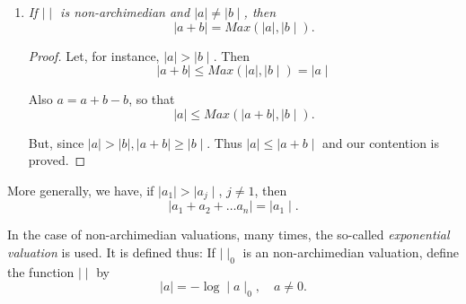 \begin{enumerate}[1)]
\begin{proof}
If $ \mid \mid $ is  a non-archimedian valuation, then for every
integer $n,  \mid n \mid  \leq 1 $. Let $m$ be any positive
integer. Then  
$$
( a + b )^m = a^m + ( ^m_1 ) a^{m-1} b + \ldots + b^m
$$
so that
\begin{gather*}
 \mid a + b \mid^m \leq  \mid a \mid^m + \mid a \mid^{m-1} \mid b \mid
 + \ldots + \mid b \mid^m \\ 
 \leq ( m + 1 ) Max ( \mid a \mid^m,   \mid b \mid^m ) . 
\end{gather*}

Taking $m$th roots and making $ m \rightarrow \infty$ we get 
$$
\mid a + b \mid \leq Max ( \mid a \mid, \mid b \mid ) .
$$

The converse is trivial, since $ \mid n \mid = \mid 1 + \dots + 1 \mid
\leq 1 $. 
\end{proof}

We\pageoriginale deduce easily

\item \textit{If $ \mid \mid $ is non-archimedian and  $ \mid a \mid
  \neq  \mid b \mid $, then} 
 $$
 \mid a + b \mid = Max ( \mid a \mid, \mid b \mid ) .
 $$
 
 \begin{proof}
Let, for instance, $ \mid a \mid > \mid b \mid $. Then  
$$
\mid a  + b \mid  \leq Max ( \mid a \mid ,  \mid b \mid ) = \mid a
\mid 
$$

Also $ a = a + b -b $, so that 
$$
\mid a \mid \leq Max ( \mid a + b \mid , \mid b \mid ).
$$

But, since $ \mid a \mid > \mid b \mid ,  \mid a + b \mid \ge \mid b
\mid $. Thus $ \mid a \mid \leq \mid a + b \mid $ and our contention
is proved. 
 \end{proof}
  \end{enumerate}

 More generally, we have, if $ \mid a_1 \mid > \mid a_j \mid $, $ j
 \neq 1 $, then  
 $$
 \mid a_1 + a_2 + \ldots a_n  \mid = \mid a_1 \mid .
 $$

 
 In the case of non-archimedian valuations, many times, the so-called
 \textit{exponential valuation} is used. It is defined thus: If 
 $\mid \mid_0 $ is an non-archi\-median valuation, define the  function 
 $\mid \mid $ by  
 $$
 \mid a \mid  = - \log  \mid a \mid_0,   \quad a \neq 0 . 
 $$
 

